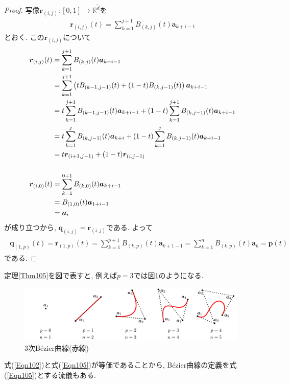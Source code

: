 \documentclass{jsarticle}
\newcommand\setR{\mathbb{R}}
\newcommand\Pare[1]{\left(#1\right)}
\theoremstyle{definition}%
\begin{document}
\begin{proof}
	写像$\bm{r}_{(i,j)}:[0,1]\to \setR^{\tilde{d}}$を
	\begin{align}
		\bm{r}_{(i,j)}(t)
		=\sum_{k=1}^{j+1} B_{(k,j)}(t)\bm{a}_{k+i-1}
	\end{align}
    とおく.
    この$\bm{r}_{(i,j)}$について
    \begin{align}
        &\begin{aligned}
            \bm{r}_{(i,j)}(t)
            &=\sum_{k=1}^{j+1} B_{(k,j)}(t)\bm{a}_{k+i-1} \\
            &=\sum_{k=1}^{j+1} \Pare{tB_{(k-1,j-1)}(t)+(1-t)B_{(k,j-1)}(t)}\bm{a}_{k+i-1} \\
            &=t\sum_{k=1}^{j+1}B_{(k-1,j-1)}(t)\bm{a}_{k+i-1}+(1-t)\sum_{k=1}^{j+1}B_{(k,j-1)}(t)\bm{a}_{k+i-1} \\
            &=t\sum_{k=1}^{j} B_{(k,j-1)}(t)\bm{a}_{k+i}+(1-t)\sum_{k=1}^{j} B_{(k,j-1)}(t)\bm{a}_{k+i-1} \\
            &=t\bm{r}_{(i+1,j-1)}+(1-t)\bm{r}_{(i,j-1)}
        \end{aligned} \\ \notag \\
        &\begin{aligned}
            \bm{r}_{(i,0)}(t)
            &=\sum_{k=1}^{0+1} B_{(k,0)}(t)\bm{a}_{k+i-1} \\
            &=B_{(1,0)}(t)\bm{a}_{1+i-1} \\
            &=\bm{a}_{i}
        \end{aligned}
    \end{align}
    が成り立つから, $\bm{q}_{(i,j)}=\bm{r}_{(i,j)}$である.
    よって
    \begin{align}
        \begin{aligned}
            \bm{q}_{(1,p)}(t)
            =\bm{r}_{(1,p)}(t)
            =\sum_{k=1}^{p+1} B_{(k,p)}(t)\bm{a}_{k+1-1}
            =\sum_{k=1}^{n} B_{(k,p)}(t)\bm{a}_{k}
            =\bm{p}(t)
        \end{aligned}
    \end{align}
    である.
\end{proof}


定理\ref{Thm105}を図で表すと, 例えば$p=3$では図\ref{Fig103}のようになる.
\addtocounter{footnote}{-1}
\begin{figure}[H]
	\centering
    \includegraphics[page=3,clip,width=110mm]{fig.pdf}
	\caption{3次B\'ezier曲線(赤線)\protect\footnotemark}
	\label{Fig103}
\end{figure}
式(\ref{Eqn102})と式(\ref{Eqn105})が等価であることから, B\'ezier曲線の定義を式(\ref{Eqn105})とする流儀もある.
\end{document}
